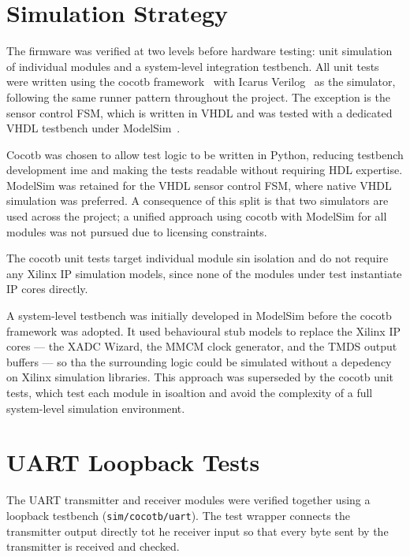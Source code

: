 
\section{Simulation Strategy}

The firmware was verified at two levels before hardware testing: unit simulation of individual modules and a system-level integration testbench. All unit tests were written using the cocotb framework~\cite{cocotb} with Icarus Verilog~\cite{icarus} as the simulator, following the same runner pattern throughout the project. The exception is the sensor control FSM, which is written in VHDL and was tested with a dedicated VHDL testbench under ModelSim~\cite{modelsim}.

Cocotb was chosen to allow test logic to be written in Python, reducing testbench development ime and making the tests readable without requiring HDL expertise. ModelSim was retained for the VHDL sensor control FSM, where native VHDL simulation was preferred. A consequence of this split is that two simulators are used across the project; a unified approach using cocotb with ModelSim for all modules was not pursued due to licensing constraints.

The cocotb unit tests target individual module sin isolation and do not require any Xilinx IP simulation models, since none of the modules under test instantiate IP cores directly.

A system-level testbench was initially developed in ModelSim before the cocotb framework was adopted. It used behavioural stub models to replace the Xilinx IP cores --- the XADC Wizard, the MMCM clock generator, and the TMDS output buffers --- so tha the surrounding logic could be simulated without a depedency on Xilinx simulation libraries. This approach was superseded by the cocotb unit tests, which test each module in isoaltion and avoid the complexity of a full system-level simulation environment.

\section{UART Loopback Tests}

The UART transmitter and receiver modules were verified together using a loopback testbench (\texttt{sim/cocotb/uart}). The test wrapper connects the transmitter output directly tot he receiver input so that every byte sent by the transmitter is received and checked.


